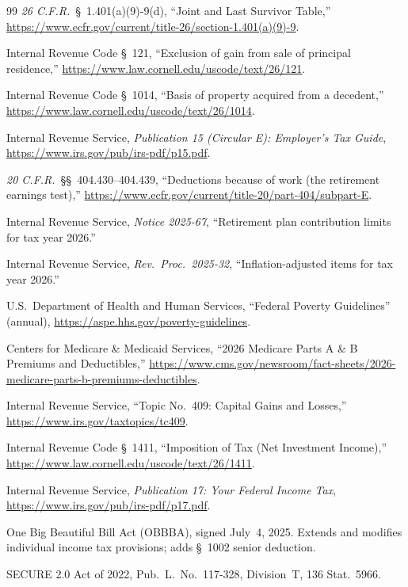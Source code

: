 \documentclass[fleqn,12pt]{report}
\begin{document}
\begin{thebibliography}{99}
\textit{26 C.F.R.}\ \S~1.401(a)(9)-9(d),
``Joint and Last Survivor Table,''
\url{https://www.ecfr.gov/current/title-26/section-1.401(a)(9)-9}.

Internal Revenue Code \S~121,
``Exclusion of gain from sale of principal residence,''
\url{https://www.law.cornell.edu/uscode/text/26/121}.

Internal Revenue Code \S~1014,
``Basis of property acquired from a decedent,''
\url{https://www.law.cornell.edu/uscode/text/26/1014}.

Internal Revenue Service,
\textit{Publication 15 (Circular E): Employer's Tax Guide},
\url{https://www.irs.gov/pub/irs-pdf/p15.pdf}.

\textit{20 C.F.R.}\ \S\S~404.430--404.439,
``Deductions because of work (the retirement earnings test),''
\url{https://www.ecfr.gov/current/title-20/part-404/subpart-E}.

Internal Revenue Service,
\textit{Notice 2025-67},
``Retirement plan contribution limits for tax year 2026.''

Internal Revenue Service,
\textit{Rev.\ Proc.\ 2025-32},
``Inflation-adjusted items for tax year 2026.''

U.S.\ Department of Health and Human Services,
``Federal Poverty Guidelines'' (annual),
\url{https://aspe.hhs.gov/poverty-guidelines}.

Centers for Medicare \& Medicaid Services,
``2026 Medicare Parts A \& B Premiums and Deductibles,''
\url{https://www.cms.gov/newsroom/fact-sheets/2026-medicare-parts-b-premiums-deductibles}.

Internal Revenue Service,
``Topic No.\ 409: Capital Gains and Losses,''
\url{https://www.irs.gov/taxtopics/tc409}.

Internal Revenue Code \S~1411,
``Imposition of Tax (Net Investment Income),''
\url{https://www.law.cornell.edu/uscode/text/26/1411}.

Internal Revenue Service,
\textit{Publication 17: Your Federal Income Tax},
\url{https://www.irs.gov/pub/irs-pdf/p17.pdf}.

One Big Beautiful Bill Act (OBBBA), signed July~4, 2025.
Extends and modifies individual income tax provisions;
adds \S~1002 senior deduction.

SECURE 2.0 Act of 2022,
Pub.\ L.\ No.\ 117-328, Division~T, 136 Stat.\ 5966.


\end{thebibliography}
\end{document}
